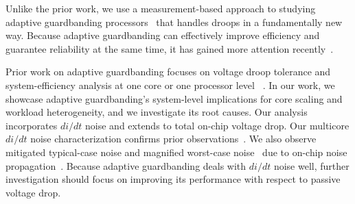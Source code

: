 Unlike the prior work, we use a measurement-based approach to studying adaptive guardbanding processors~\cite{fischer200590nm,tschanz2007adaptive,kurd2008next,lefurgy2011active,bowman201222nm} that handles droops in a fundamentally new way. Because adaptive guardbanding can effectively improve efficiency and guarantee reliability at the same time, it has gained more attention recently~\cite{grenat20145,tokunaga20145,bowman20158}.

Prior work on adaptive guardbanding focuses on voltage droop tolerance and system-efficiency analysis at one core or one processor level ~\cite{fischer200590nm,tschanz2007adaptive,kurd2008next,lefurgy2011active,bowman201222nm,grenat20145,tokunaga20145,bowman20158}. In our work, we showcase adaptive guardbanding's system-level implications for core scaling and workload heterogeneity, and we investigate its root causes. Our analysis incorporates $di/dt$ noise and extends to total on-chip voltage drop. Our multicore $di/dt$ noise characterization confirms prior observations~\cite{gupta2007understanding,reddi2010voltage,miller2012vrsync}. We also observe mitigated typical-case noise and magnified worst-case noise~\cite{miller2012vrsync} due to on-chip noise propagation~\cite{gupta2007understanding,reddi2010voltage}. Because adaptive guardbanding deals with $di/dt$ noise well, further investigation should focus on improving its performance with respect to passive voltage drop.










